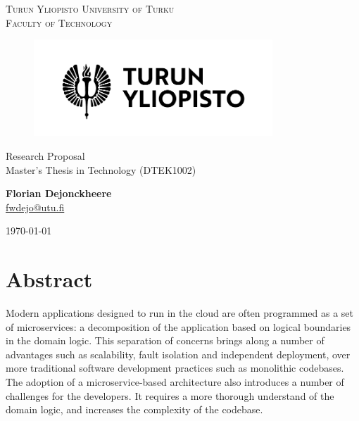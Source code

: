 \documentclass[12pt]{article}
\makeatletter
\newcommand{\faculty}{Faculty of Technology}
\newcommand{\course}{Master's Thesis in Technology (DTEK1002)}
\newcommand{\documenttitle}{Research Proposal}
\newcommand{\authorname}{Florian Dejonckheere}
\newcommand{\authoremail}{fwdejo@utu.fi}
\newcommand{\documentdate}{\today}
\makeatother
\begin{document}
	\begin{titlepage}
		\begin{center}
			\textsc{Turun Yliopisto \textemdash \hspace{1mm} University of Turku} \\
			\textsc{\faculty}
		\end{center}
		\begin{figure}[h]
			\vspace{10mm}

			\centering\includegraphics[width=0.8\textwidth]{logo-fi}

			\vspace{20mm}
		\end{figure}
		\begin{center}
			\fontsize{10mm}{7mm}\selectfont
			\textup{\documenttitle} \\
			\textnormal{ \Large{\course}} \\

			\vspace{25mm}

			\large{\textbf{\authorname}} \\
			\large{\href{mailto:\authoremail}{\authoremail}} \\

			\vspace{35mm}

			\documentdate
		\end{center}
	\end{titlepage}

	\clearpage


	\tableofcontents

	\cleardoublepage


	\section{Abstract}

	Modern applications designed to run in the cloud are often programmed as a set of microservices: a decomposition of the application based on logical boundaries in the domain logic.
	This separation of concerns brings along a number of advantages such as scalability, fault isolation and independent deployment, over more traditional software development practices such as monolithic codebases.
	The adoption of a microservice-based architecture also introduces a number of challenges for the developers.
	It requires a more thorough understand of the domain logic, and increases the complexity of the codebase.
\end{document}
